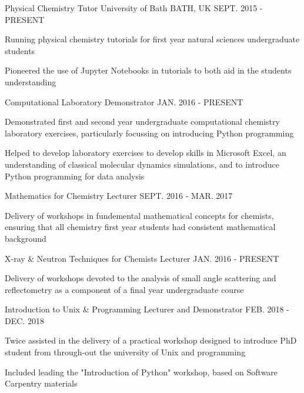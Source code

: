 \begin{cventries}
	\cventry
	{Physical Chemistry Tutor}
	{University of Bath}
	{BATH, UK}
	{SEPT. 2015 - PRESENT}
	{
		\begin{cvitems}
			\item {Running physical chemistry tutorials for first year natural sciences undergraduate students}
			\item {Pioneered the use of Jupyter Notebooks in tutorials to both aid in the students understanding}
		\end{cvitems}
	}
	\cventry
	{Computational Laboratory Demonstrator}
	{}
	{}
	{JAN. 2016 - PRESENT}
	{
		\begin{cvitems}
			\item {Demonstrated first and second year undergraduate computational chemistry laboratory exercises, particularly focussing on introducing Python programming}
			\item {Helped to develop laboratory exercises to develop skills in Microsoft Excel, an understanding of classical molecular dynamics simulations, and to introduce Python programming for data analysis}
		\end{cvitems}
	}
	\cventry
	{Mathematics for Chemistry Lecturer}
	{}
	{}
	{SEPT. 2016 - MAR. 2017}
	{
		\begin{cvitems}
			\item {Delivery of workshops in fundemental mathematical concepts for chemists, ensuring that all chemistry first year students had consistent mathematical background}
		\end{cvitems}
	}
	\cventry
	{X-ray \& Neutron Techniques for Chemists Lecturer}
	{}
	{}
	{JAN. 2016 - PRESENT}
	{
		\begin{cvitems}
			\item {Delivery of workshops devoted to the analysis of small angle scattering and reflectometry as a component of a final year undergraduate course}
		\end{cvitems}
	}
	\cventry
	{Introduction to Unix \& Programming Lecturer and Demonstrator}
	{}
	{}
	{FEB. 2018 - DEC. 2018}
	{
		\begin{cvitems}
			\item {Twice assisted in the delivery of a practical workshop designed to introduce PhD student from through-out the university of Unix and programming}
			\item {Included leading the "Introduction of Python" workshop, based on Software Carpentry materials}

\end{cvitems}}
\end{cventries}
